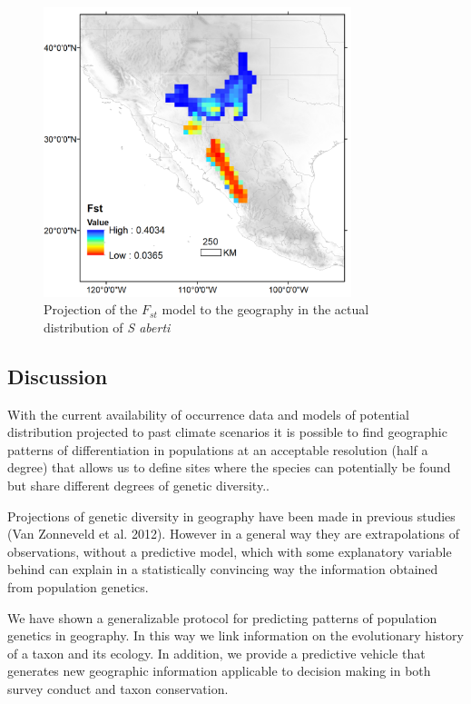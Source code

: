 \documentclass[
]{article}
\begin{document}
\begin{figure}
\centering
\includegraphics[width=0.8\textwidth,height=\textheight]{all_figures/figure_6.png}
\caption{Projection of the \(F_{st}\) model to the geography in the
actual distribution of \emph{S aberti}}
\end{figure}

\hypertarget{discussion}{%
\subsection{Discussion}\label{discussion}}

With the current availability of occurrence data and models of potential
distribution projected to past climate scenarios it is possible to find
geographic patterns of differentiation in populations at an acceptable
resolution (half a degree) that allows us to define sites where the
species can potentially be found but share different degrees of genetic
diversity..

Projections of genetic diversity in geography have been made in previous
studies (Van Zonneveld et al. 2012). However in a general way they are
extrapolations of observations, without a predictive model, which with
some explanatory variable behind can explain in a statistically
convincing way the information obtained from population genetics.

We have shown a generalizable protocol for predicting patterns of
population genetics in geography. In this way we link information on the
evolutionary history of a taxon and its ecology. In addition, we provide
a predictive vehicle that generates new geographic information
applicable to decision making in both survey conduct and taxon
conservation.
\end{document}

